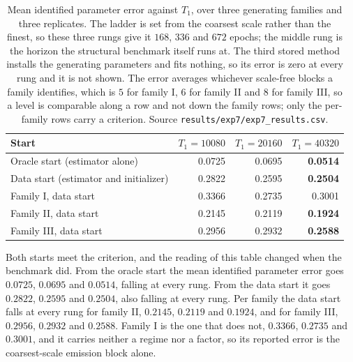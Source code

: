 \begin{table}[t]
\centering
\caption{Mean identified parameter error against $T_1$, over three generating
families and three replicates. The ladder is set from the coarsest scale rather
than the finest, so these three rungs give it $168$, $336$ and $672$ epochs;
the middle rung is the horizon the structural benchmark itself runs at. The third stored method installs the generating
parameters and fits nothing, so its error is zero at every rung and it is not
shown. The error averages whichever scale-free blocks a family identifies,
which is $5$ for family I, $6$ for family II and $8$ for family III, so a level
is comparable along a row and not down the family rows; only the per-family rows
carry a criterion. Source \texttt{results/exp7/exp7\_results.csv}.}
\label{tab:results:ladder}
\begin{tabular}{lrrr}
\toprule
Start & $T_1 = 10080$ & $T_1 = 20160$ & $T_1 = 40320$ \\
\midrule
Oracle start (estimator alone) & 0.0725 & 0.0695 & \textbf{0.0514} \\
Data start (estimator and initializer) & 0.2822 & 0.2595 & \textbf{0.2504} \\
\midrule
Family I, data start   & 0.3366 & 0.2735 & 0.3001 \\
Family II, data start  & 0.2145 & 0.2119 & \textbf{0.1924} \\
Family III, data start & 0.2956 & 0.2932 & \textbf{0.2588} \\
\bottomrule
\end{tabular}
\end{table}

Both starts meet the criterion, and the reading of this table changed when the
benchmark did. From the oracle start the mean identified parameter error goes
$0.0725$, $0.0695$ and $0.0514$, falling at every rung. From the data start it
goes $0.2822$, $0.2595$ and $0.2504$, also falling at every rung. Per family the
data start falls at every rung for family II, $0.2145$, $0.2119$ and $0.1924$,
and for family III, $0.2956$, $0.2932$ and $0.2588$. Family I is the one that
does not, $0.3366$, $0.2735$ and $0.3001$, and it carries neither a regime nor a
factor, so its reported error is the coarsest-scale emission block alone.

